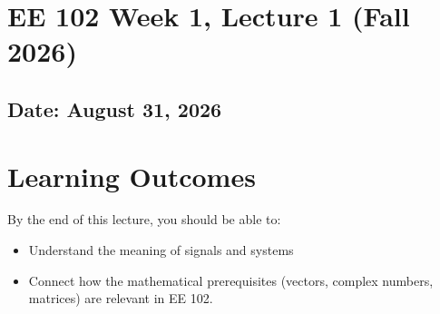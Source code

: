 \documentclass{ee102_notes}
\renewcommand{\releasedate}{August 31, 2026}
\begin{document}
\section*{EE 102 Week 1, Lecture 1 (Fall 2026)}
\subsection*{Date: \releasedate}
\section*{Learning Outcomes}
By the end of this lecture, you should be able to:
\begin{itemize}
  \item Understand the meaning of signals and systems
  \item Connect how the mathematical prerequisites (vectors, complex numbers, matrices) are relevant in EE 102.
\end{itemize}
\tableofcontents
\newpage 

\end{document}
